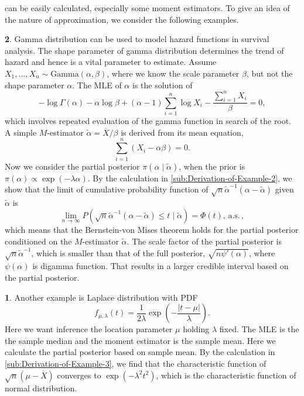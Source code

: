 \documentclass[oneside,english]{amsbook}
\numberwithin{section}{chapter}
\numberwithin{equation}{section}
\numberwithin{figure}{section}
\theoremstyle{plain}
\theoremstyle{plain}
\theoremstyle{definition}
\theoremstyle{plain}
\theoremstyle{plain}
\theoremstyle{remark}
\theoremstyle{definition}
\newtheorem{example}{\protect\examplename}
\theoremstyle{definition}
\newcommand{\ascv}{\,\mathrm{a.s.}\,}
\providecommand{\examplename}{Example}
\begin{document}
can be easily calculated, especially some moment estimators. To give
an idea of the nature of approximation, we consider the following
examples.
\begin{example}
\label{exa:Gamma-distribution}Gamma distribution can be used to model
hazard functions in survival analysis. The shape parameter of gamma
distribution determines the trend of hazard and hence is a vital parameter
to estimate. Assume $X_{1},\ldots,X_{n}\sim\mathrm{Gamma}\left(\alpha,\beta\right)$,
where we know the scale parameter $\beta$, but not the shape parameter
$\alpha$. The MLE of $\alpha$ is the solution of 
\[
-\log\Gamma\left(\alpha\right)-\alpha\log\beta+\left(\alpha-1\right)\sum_{i=1}^{n}\log X_{i}-\frac{\sum_{i=1}^{n}X_{i}}{\beta}=0,
\]
which involves repeated evaluation of the gamma function in search
of the root. A simple $M$-estimator $\tilde{\alpha}=\overline{X}/\beta$
is derived from its mean equation, 
\[
\sum_{i=1}^{n}\left(X_{i}-\alpha\beta\right)=0.
\]
 Now we consider the partial posterior $\pi\left(\alpha\mid\tilde{\alpha}\right)$,
when the prior is $\pi\left(\alpha\right)\propto\exp\left(-\lambda\alpha\right)$.
By the calculation in  \ref{sub:Derivation-of-Example-2}, we show
that the limit of cumulative probability function of $\sqrt{n}\tilde{\alpha}^{-1}\left(\alpha-\tilde{\alpha}\right)$
given $\tilde{\alpha}$ is 
\[
\lim_{n\rightarrow\infty}P\left(\sqrt{n}\tilde{\alpha}^{-1}\left(\alpha-\tilde{\alpha}\right)\le t\mid\tilde{\alpha}\right)=\Phi\left(t\right),\ascv,
\]
which means that the Bernstein-von Mises theorem holds for the partial
posterior conditioned on the $M$-estimator $\tilde{\alpha}$. The
scale factor of   the partial posterior is $\sqrt{n}\tilde{\alpha}^{-1}$,
which is smaller than that of {the
} full posterior, $\sqrt{n\psi'\left(\alpha\right)}$,
where $\psi\left(\alpha\right)$ is digamma function. That results
in a larger credible interval based on the partial posterior. 
\begin{example}
\label{exa:laplace-example}Another example is Laplace distribution
with PDF 
\[
f_{\mu,\lambda}\left(t\right)=\frac{1}{2\lambda}\exp\left(-\frac{\left|t-\mu\right|}{\lambda}\right).
\]
 Here we want inference the location parameter $\mu$ holding $\lambda$
fixed. The MLE is the {the } sample
median and the moment estimator is {the
}sample mean. Here we calculate the partial posterior based on sample
mean. By the calculation in  \ref{sub:Derivation-of-Example-3}, we
find that the characteristic function of $\sqrt{n}\left(\mu-\overline{X}\right)$
converges to $\exp\left(-\lambda^{2}t^{2}\right)$, which is the characteristic
function of normal distribution. 
\end{example}
\end{example}
\end{document}
